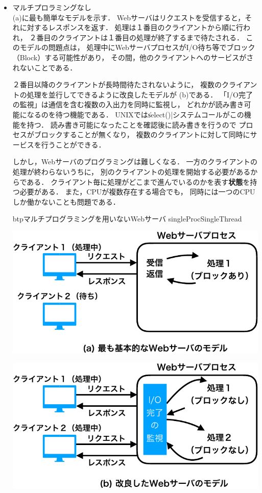 \begin{itemize}
\item マルチプロラミングなし \\
(a)に最も簡単なモデルを示す．
Webサーバはリクエストを受信すると，それに対するレスポンスを返す．
処理は１番目のクライアントから順に行われ，
２番目のクライアントは１番目の処理が終了するまで待たされる．
このモデルの問題点は，
処理中にWebサーバプロセスがI/O待ち等でブロック（Block）する可能性があり，
その間，他のクライアントへのサービスがされないことである．

２番目以降のクライアントが長時間待たされないように，
複数のクライアントの処理を並行してできるように改良したモデルが
(b)である．
「I/O完了の監視」は通信を含む複数の入出力を同時に監視し，
どれかが読み書き可能になるのを待つ機能である．
UNIXでは\|select()|システムコールがこの機能を持つ．
読み書き可能になったことを確認後に読み書きを行うので
プロセスがブロックすることが無くなり，
複数のクライアントに対して同時にサービスを行うことができる．

しかし，Webサーバのプログラミングは難しくなる．
一方のクライアントの処理が終わらないうちに，
別のクライアントの処理を開始する必要があるからである．
クライアント毎に処理がどこまで進んでいるのかを表す{\bf 状態}を持つ必要がある．
また，CPUが複数存在する場合でも，
同時には一つのCPUしか働かないことも問題である．

\begin{myfig}{btp}{マルチプログラミングを用いないWebサーバ}
{singleProcSingleThread}
\begin{center}
\includegraphics[scale=0.6]{Fig/singleProcSingleClient-crop.pdf}

\vspace{0.8cm}

\includegraphics[scale=0.6]{Fig/singleProcMultiClient-crop.pdf}
\end{center}
\end{myfig}


\end{itemize}
